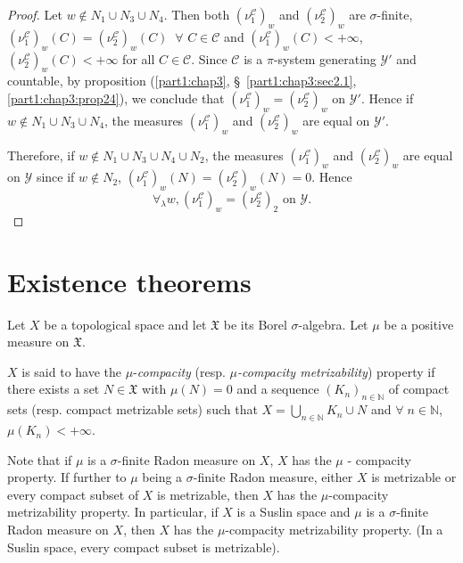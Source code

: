 \begin{proof}
Let $w \not\in N_1 \cup N_3 \cup N_4$. Then both
$(\nu^\mathscr{C}_1)_w$ and $(\nu^\mathscr{C}_2)_w$ are
$\sigma$-finite, $(\nu^\mathscr{C}_1)_w(C) = (\nu^\mathscr{C}_2)_w (C)
\;\; \forall$ $C \in \mathscr{C}$ and $(\nu^\mathscr{C}_1)_w(C) < +
\infty$, $(\nu^\mathscr{C}_2)_w (C)< + \infty$ for all $C \in
\mathscr{C}$. Since $\mathscr{C}$ is a $\pi$-system generating
$\mathscr{Y}'$ and countable, by proposition (\ref{part1:chap3},
\S\ \ref{part1:chap3:sec2.1}, \ref{part1:chap3:prop24}), we 
conclude that $(\nu^\mathscr{C}_1)_w = (\nu^\mathscr{C}_2)_w$ on
$\mathscr{Y}'$. Hence if $w \not\in N_1 \cup N_3 \cup N_4$, the
measures $(\nu^\mathscr{C}_1)_w$ and $(\nu^\mathscr{C}_2)_w$ are equal
on $\mathscr{Y}'$. 

Therefore, if $w \not\in N_1 \cup N_3 \cup N_4 \cup N_2$, the measures
$(\nu^\mathscr{C}_1)_w$  and $(\nu^\mathscr{C}_2)_w$ are\pageoriginale
equal on $\mathscr{Y}$ since if $w \not\in N_2$,
$(\nu^\mathscr{C}_1)_w(N) = (\nu^\mathscr{C}_2)_w (N) = 0$. Hence 
$$
\forall_\lambda w, (\nu^\mathscr{C}_1)_w = (\nu^\mathscr{C}_2)_2
\text{ on } \mathscr{Y}. 
$$
\end{proof}

\section{Existence theorems}\label{part1:chap3:sec4}

Let $X$ be a topological space and let $\mathfrak{X}$ be its Borel
$\sigma$-algebra. Let $\mu$ be a positive measure on $\mathfrak{X}$.

\begin{defn}\label{part1:chap3:def37}
$X$ is said to have the $\mu$-{\em compacity} (resp. {\em
    $\mu$-compacity metrizability}) property if there exists a set $N
  \in \mathfrak{X}$ with $\mu(N) = 0$ and a sequence $(K_n)_{n \in
    \mathbb{N}}$  of compact sets (resp. compact metrizable sets) such
  that $X = \bigcup\limits_{n \in \mathbb{N}} K_n \cup N$ and $\forall \;
  n \in \mathbb{N}$, $\mu(K_n) < + \infty$. 
\end{defn}

Note that if $\mu $ is  a $\sigma$-finite Radon measure on $X$, $X$
has the $\mu$ - compacity property. If further to $\mu$ being a
$\sigma$-finite Radon measure, either $X$ is metrizable or every
compact subset of $X$ is metrizable, then $X$ has the $\mu$-compacity
metrizability property. In particular, if $X$ is a Suslin space and
$\mu$ is a $\sigma$-finite Radon measure on $X$, then $X$ has the
$\mu$-compacity metrizability property. (In a Suslin space, every
compact subset is metrizable). 

